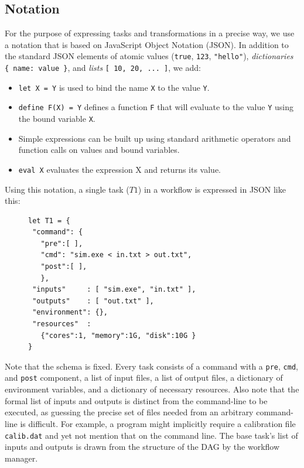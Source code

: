 \documentclass[conference]{IEEEtran}
\begin{document}
\subsection{Notation}

For the purpose of expressing tasks and transformations in a
precise way, we use a notation that is based on
JavaScript Object Notation (JSON).
In addition to the standard JSON elements of 
atomic values (\verb$true$, \verb$123$, \verb$"hello"$), \emph{dictionaries} \verb${ name: value }$, and \emph{lists} \verb$[ 10, 20, ... ]$,
we add:

\begin{itemize}
    \item {\tt let X = Y} is used to bind the name {\tt X} to the value {\tt Y}.
    \item {\tt define F(X) = Y} defines a function {\tt F} that will evaluate to the value {\tt Y} using the bound variable {\tt X}.
    \item Simple expressions can be built up using standard arithmetic operators and function calls on values and bound variables.
    \item {\tt eval X} evaluates the expression X and returns its value.
\end{itemize}

Using this notation, a single task ($T1$) in a workflow
is expressed in JSON like this:

\begin{figure}[H]
\begin{framed}
\begin{verbatim}
let T1 = {
 "command": {
   "pre":[ ],
   "cmd": "sim.exe < in.txt > out.txt",
   "post":[ ], 
   },
 "inputs"     : [ "sim.exe", "in.txt" ],
 "outputs"    : [ "out.txt" ],
 "environment": {},
 "resources"  :
   {"cores":1, "memory":1G, "disk":10G }
}
\end{verbatim}
\end{framed}
\label{basic-task}
\end{figure}

Note that the schema is fixed.
Every task consists of a command with a \verb$pre$, \verb$cmd$, and \verb$post$ component, a list of input files, a list of output files,
a dictionary of environment variables, 
and a dictionary of necessary resources.  
Also note that the formal list of
inputs and outputs is distinct from the command-line to be executed,
as guessing the precise set of files needed from 
an arbitrary command-line is difficult.  For example,
a program might implicitly require a calibration file {\tt calib.dat}
and yet not mention that on the command line.  
The base task's list of inputs
and outputs is drawn from the structure of the DAG by the workflow
manager.
\end{document}
